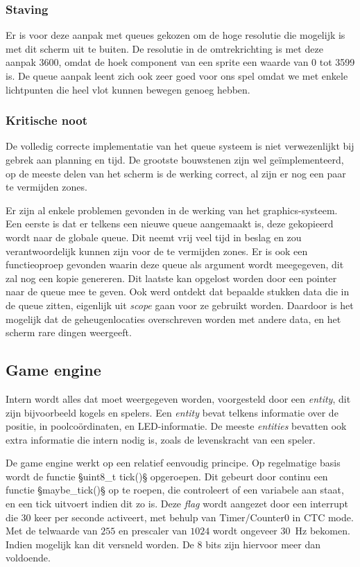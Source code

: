 \documentclass[12pt]{ugentreport}
\begin{document}
\subsubsection{Staving}
Er is voor deze aanpak met queues gekozen om de hoge resolutie die mogelijk is met dit scherm uit te buiten. De resolutie in de 
omtrekrichting is met deze aanpak 3600, omdat de hoek component van een sprite een waarde van 0 tot 3599 is. De queue aanpak leent zich 
ook zeer goed voor ons spel omdat we met enkele lichtpunten die heel vlot kunnen bewegen genoeg hebben.

\subsubsection{Kritische noot}
De volledig correcte implementatie van het queue systeem is niet verwezenlijkt bij gebrek aan planning en tijd. De grootste bouwstenen 
zijn wel geïmplementeerd, op de meeste delen van het scherm is de werking correct, al zijn er nog een paar te vermijden zones.

Er zijn al enkele problemen gevonden in de werking van het graphics-systeem. Een
eerste is dat er telkens een nieuwe queue aangemaakt is, deze gekopieerd wordt
naar de globale queue. Dit neemt vrij veel tijd in beslag en zou
verantwoordelijk kunnen zijn voor de te vermijden zones. Er is ook een
functieoproep gevonden waarin deze queue als argument wordt meegegeven, dit zal
nog een kopie genereren. Dit laatste kan opgelost worden door een pointer naar
de queue mee te geven. Ook werd ontdekt dat bepaalde stukken data die in de
queue zitten, eigenlijk uit \emph{scope} gaan voor ze gebruikt worden. Daardoor
is het mogelijk dat de geheugenlocaties overschreven worden met andere data, en
het scherm rare dingen weergeeft.

\subsection{Game engine}
Intern wordt alles dat moet weergegeven worden, voorgesteld door een
\emph{entity}, dit zijn bijvoorbeeld kogels en spelers. Een \emph{entity} bevat
telkens informatie over de positie, in poolcoördinaten, en LED-informatie. De
meeste \emph{entities} bevatten ook extra informatie die intern nodig is, zoals
de levenskracht van een speler.

De game engine werkt op een relatief eenvoudig principe.
Op regelmatige basis wordt de functie §uint8_t tick()§
opgeroepen. Dit gebeurt door continu een functie §maybe_tick()§ op te roepen,
die controleert of een variabele aan staat, en een tick uitvoert indien dit zo
is. Deze \emph{flag} wordt aangezet door een interrupt die 30 keer per seconde
activeert, met behulp van Timer/Counter0 in CTC mode. Met de telwaarde van $255$
en prescaler van $1024$ wordt ongeveer \SI{30}{\hertz} bekomen. Indien mogelijk
kan dit versneld worden. De 8 bits zijn hiervoor meer dan voldoende.
\end{document}
